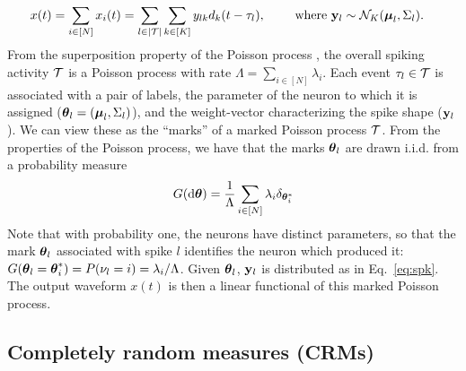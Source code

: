 \begin{align}
  x(t) &= \sum_{i \in [N]} x_{i}(t) =   \sum_{l \in |\mc{T}|} \sum_{k \in [K]} y_{lk} d_k(t - \tau_{l}), \qquad %
  \text{ where } \by_{l}  \sim \mc{N}_K(\mb{\mu}_{l}, \Sigma_{l}). \label{eq:spk}
\end{align}
% 
From the superposition property of the Poisson process \citep{kingman93}, the overall spiking activity $\mathcal{T}$ is a 
Poisson process with rate $\Lambda = \sum_{i \in [N]} \lambda_i$. Each event $\tau_l \in \mathcal{T}$ is associated with a pair of labels, the parameter of the neuron to which it 
is assigned ($\boldsymbol{\theta}_l = (\boldsymbol{\mu}_l, \Sigma_l)$), and the weight-vector characterizing the spike shape ($\mathbf{y}_l$). We can view these as the ``marks'' of a 
marked Poisson process $\mathcal{T}$.  From the properties of the Poisson process, we have that the marks $\boldsymbol{\theta}_l$ are drawn i.i.d. from a probability measure 
\begin{align}
 G(\mathrm{d} \boldsymbol{\theta}) = \frac{1}{\Lambda}\sum_{i \in [N]} \lambda_i \delta_{\boldsymbol{\theta}^*_i}    \label{eq:mark_distr}
\end{align}
Note that with probability one, the neurons have distinct parameters, so that the mark $\boldsymbol{\theta}_l$ associated with spike $l$ identifies the
neuron which produced it: $G(\boldsymbol{\theta}_l = \boldsymbol{\theta}^*_i) = P(\nu_l= i) = \lambda_i/\Lambda$. Given $\boldsymbol{\theta}_l$, $\mathbf{y}_l$ is distributed as in
Eq.~\eqref{eq:spk}. The output waveform $x(t)$ is then a linear functional of this marked Poisson process. %

\subsection{Completely random measures (CRMs)}

